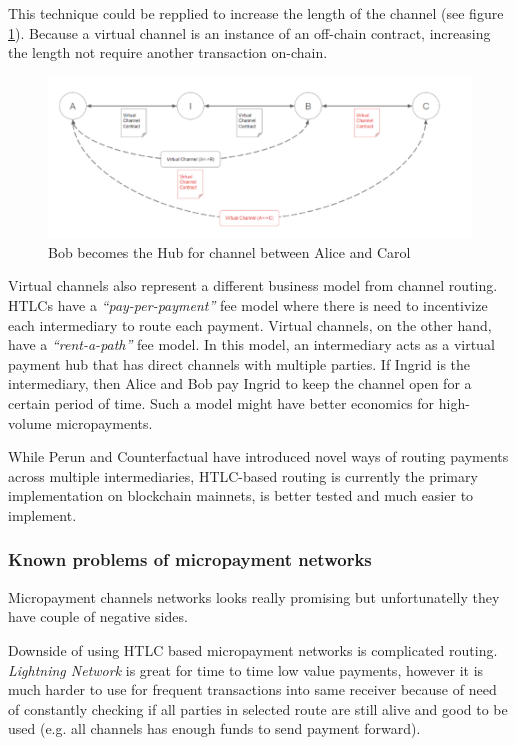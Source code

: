 \documentclass[a4paper,12pt]{article}
\begin{document}
This technique could be repplied to increase the length of the channel (see 
figure \ref{img:virtual-channels}). Because a virtual channel is an instance of 
an off-chain contract, increasing the length not require another transaction 
on-chain.

\begin{figure}[H]
    \centering
    \includegraphics[scale=0.6]{../img/virtual-channels}
    \caption{Bob becomes the Hub for channel between Alice and Carol}
    \label{img:virtual-channels}
\end{figure}

Virtual channels also represent a different business model from channel routing.
HTLCs have a \textit{“pay-per-payment”} fee model where there is need to 
incentivize each intermediary to route each payment. Virtual channels, on the 
other hand, have a \textit{“rent-a-path”} fee model. In this model, an 
intermediary acts as a virtual payment hub that has direct channels with multiple
parties. If Ingrid is the intermediary, then Alice and Bob pay Ingrid to keep 
the channel open for a certain period of time. Such a model might have better 
economics for high-volume micropayments.

While Perun and Counterfactual have introduced novel ways of routing payments 
across multiple intermediaries, HTLC-based routing is currently the primary 
implementation on blockchain mainnets, is better tested and much easier to 
implement.

\subsubsection{Known problems of micropayment networks}

Micropayment channels networks looks really promising but unfortunatelly they 
have couple of negative sides. 

Downside of using HTLC based micropayment networks is complicated routing. 
\textit{Lightning Network} is great for time to time low value payments, however 
it is much harder to use for frequent transactions into same receiver because of 
need of constantly checking if all parties in selected route are still alive and 
good to be used (e.g. all channels has enough funds to send payment forward).
\end{document}
